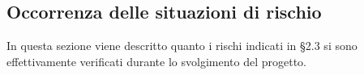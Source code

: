 \clearpage

\subsection{Occorrenza delle situazioni di rischio}
In questa sezione viene descritto quanto i rischi indicati in §2.3 si sono effettivamente verificati durante lo svolgimento del progetto.


